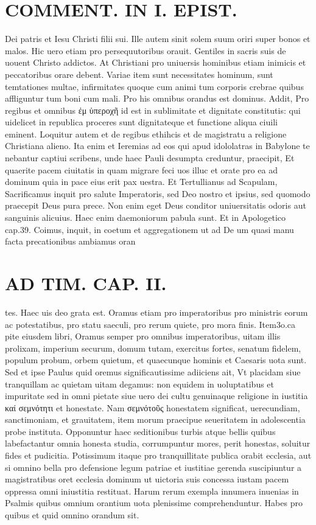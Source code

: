 \documentclass{article}
\begin{document}
\begin{pages}
\section*{COMMENT. IN I. EPIST. }\pstart Dei patris et Iesu Christi filii sui. Ille autem sinit solem suum oriri super bonos et malos. Hic uero etiam pro persequutoribus orauit. Gentiles in sacris suis de uouent Christo addictos. At Christiani pro uniuersis hominibus etiam inimicis et peccatoribus orare debent. Variae item sunt necessitates hominum, sunt temtationes multae, infirmitates quoque cum animi tum corporis crebrae quibus affliguntur tum boni cum mali. Pro his omnibus orandus est dominus. Addit, Pro regibus et omnibus ἐμ ὑπεροχῆ id est in sublimitate et dignitate constitutis: qui uidelicet in republica proceres sunt dignitateque et functione aliqua ciuili eminent. Loquitur autem et de regibus ethihcis et de magistratu a religione Christiana alieno. Ita enim et Ieremias ad eos qui apud idololatras in Babylone te nebantur captiui scribens, unde haec Pauli desumpta creduntur, praecipit, Et quaerite pacem ciuitatis in quam migrare feci uos illuc et orate pro ea ad dominum quia in pace eius erit pax uestra. Et Tertullianus ad Scapulam, Sacrificamus inquit pro salute Imperatoris, sed Deo nostro et ipsius, sed quomodo praecepit Deus pura prece. Non enim eget Deus conditor uniuersitatis odoris aut sanguinis alicuius. Haec enim daemoniorum pabula sunt. Et in Apologetico cap.39. Coimus, inquit, in coetum et aggregationem ut ad De um quasi manu facta precationibus ambiamus oran\pend
\section*{AD TIM. CAP. II. }
\marginpar{[ p.113 ]}\pstart tes. Haec uis deo grata est. Oramus etiam pro imperatoribus pro ministris eorum ac potestatibus, pro statu saeculi, pro rerum quiete, pro mora finis. Item3o.ca pite eiusdem libri, Oramus semper pro omnibus imperatoribus, uitam illis prolixam, imperium securum, domum tutam, exercitus fortes, senatum fidelem, populum probum, orbem quietum, et quaecunque hominis et Caesaris uota sunt. Sed et ipse Paulus quid oremus significautissime adiiciens ait, Vt placidam siue tranquillam ac quietam uitam degamus: non equidem in uoluptatibus et impuritate sed in omni pietate siue uero dei cultu genuinaque religione in iustitia καί σεμνότητι et honestate. Nam σεμνότοῦς honestatem significat, uerecundiam, sanctimoniam, et grauitatem, item morum praecipue seueritatem in adolescentia probe instituta. Opponuntur haec seditionibus turbis atque bellis quibus labefactantur omnia honesta studia, corrumpuntur mores, perit honestas, soluitur fides et pudicitia. Potissimum itaque pro tranquillitate publica orabit ecclesia, aut si omnino bella pro defensione legum patriae et iustitiae gerenda suscipiuntur a magistratibus oret ecclesia dominum ut uictoria suis concessa iustam pacem oppressa omni iniustitia restituat. Harum rerum exempla innumera inuenias in Psalmis quibus omnium orantium uota plenissime comprehenduntur. Habes pro quibus et quid omnino orandum sit.  \pend

\end{pages}
\end{document}
